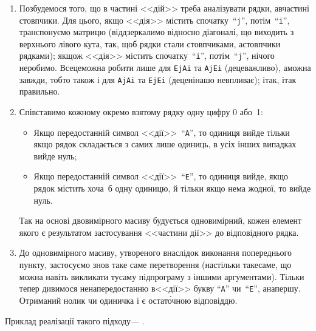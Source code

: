 {\begin{enumerate}
\item
Позбудемося того, що в частині <<дій>> треба аналізувати рядки, а\nolinebreak[3] в\nolinebreak[3] частині стовпчики. Для цього, якщо <<дія>> містить спочатку~``\texttt{j}'', потім~``\texttt{i}'', транспонуємо матрицю 
(віддзеркалимо відносно
діагоналі, що виходить з верхнього лівого кута, так, щоб рядки стали стовпчиками, а\nolinebreak[3] стовпчики рядками); якщо\nolinebreak[3] ж <<дія>> містить спочатку~``\texttt{i}'', потім~``\texttt{j}'', нічого не\nolinebreak[3] робимо. Все\nolinebreak[2] це\nolinebreak[2] можна робити лише для \texttt{EjAi} та \texttt{AjEi} (де\nolinebreak[3] це\nolinebreak[3] важливо), а\nolinebreak[3] можна завжди, тобто також і для \texttt{AjAi} та \texttt{EjEi} (де\nolinebreak[3] це\nolinebreak[1] ні\nolinebreak[2] на\nolinebreak[2] шо не\nolinebreak[2] впливає); і\nolinebreak[3] так, і\nolinebreak[3] так правильно.
\item
Співставимо кожному окремо взятому рядку одну цифру 0 або~1:
\begin{itemize}
\item
Якщо передостанній символ <<дії>>~``\texttt{A}'', то одиниця вийде тільки якщо рядок складається з самих лише одиниць, в усіх інших випадках вийде нуль;
\item
Якщо передостанній символ <<дії>>~``\texttt{E}'', то одиниця вийде, якщо рядок містить хоча~б одну одиницю, й тільки якщо нема жодної, то вийде нуль.
\end{itemize}
Так на основі двовимірного масиву будується одновимірний, кожен елемент якого є результатом застосування <<частини дії>> до відповідного рядка.
\item
До одновимірного масиву, утвореного внаслідок виконання попереднього пункту, застосуємо знов таке саме перетворення (настільки таке\nolinebreak[3] саме, що можна навіть викликати ту\nolinebreak[3] саму підпрограму з іншими аргументами). Тільки тепер дивимося не\nolinebreak[2] на\nolinebreak[2] передостанню в\nolinebreak[2] <<дії>> букву ``\texttt{A}'' чи~``\texttt{E}'', а\nolinebreak[3] на\nolinebreak[3] першу. Отриманий нолик чи одиничка і є остат\'{о}чною відповіддю.
\end{enumerate}

Приклад реалізації такого підходу\nolinebreak[3] --- .

}
